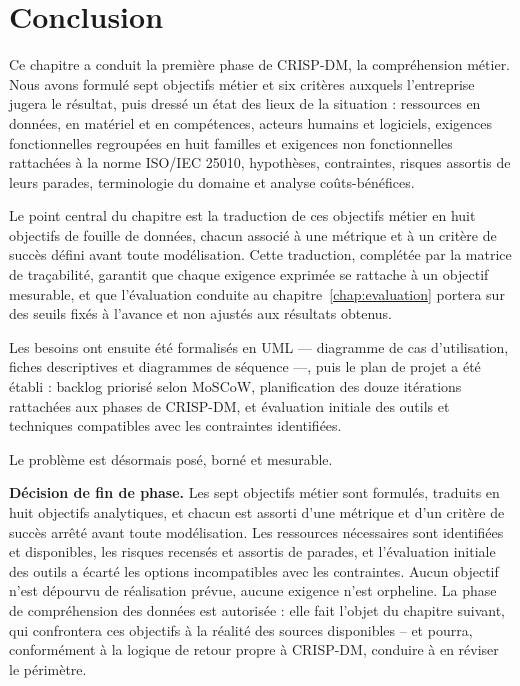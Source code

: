 \section*{Conclusion}

Ce chapitre a conduit la première phase de CRISP-DM, la compréhension métier. Nous avons formulé sept objectifs métier et six critères auxquels l'entreprise jugera le résultat, puis dressé un état des lieux de la situation : ressources en données, en matériel et en compétences, acteurs humains et logiciels, exigences fonctionnelles regroupées en huit familles et exigences non fonctionnelles rattachées à la norme ISO/IEC 25010, hypothèses, contraintes, risques assortis de leurs parades, terminologie du domaine et analyse coûts-bénéfices.

Le point central du chapitre est la traduction de ces objectifs métier en huit objectifs de fouille de données, chacun associé à une métrique et à un critère de succès défini avant toute modélisation. Cette traduction, complétée par la matrice de traçabilité, garantit que chaque exigence exprimée se rattache à un objectif mesurable, et que l'évaluation conduite au chapitre~\ref{chap:evaluation} portera sur des seuils fixés à l'avance et non ajustés aux résultats obtenus.

Les besoins ont ensuite été formalisés en UML — diagramme de cas d'utilisation, fiches descriptives et diagrammes de séquence —, puis le plan de projet a été établi : backlog priorisé selon MoSCoW, planification des douze itérations rattachées aux phases de CRISP-DM, et évaluation initiale des outils et techniques compatibles avec les contraintes identifiées.

Le problème est désormais posé, borné et mesurable.

\textbf{Décision de fin de phase.} Les sept objectifs métier sont formulés, traduits en huit objectifs analytiques, et chacun est assorti d'une métrique et d'un critère de succès arrêté avant toute modélisation. Les ressources nécessaires sont identifiées et disponibles, les risques recensés et assortis de parades, et l'évaluation initiale des outils a écarté les options incompatibles avec les contraintes. Aucun objectif n'est dépourvu de réalisation prévue, aucune exigence n'est orpheline. La phase de compréhension des données est autorisée : elle fait l'objet du chapitre suivant, qui confrontera ces objectifs à la réalité des sources disponibles -- et pourra, conformément à la logique de retour propre à CRISP-DM, conduire à en réviser le périmètre.
